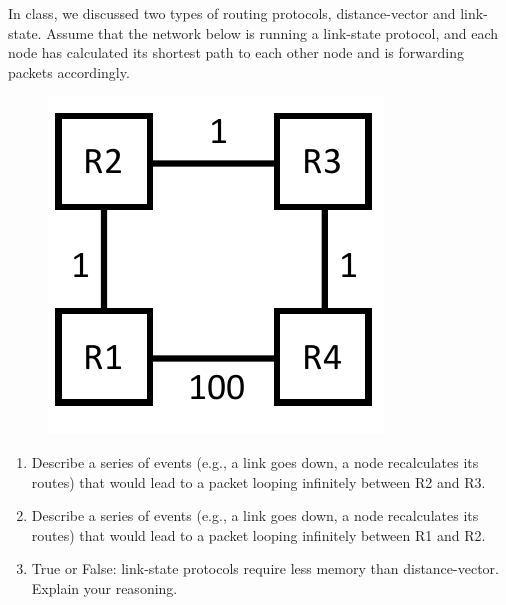 \documentclass[10pt]{article}
\newenvironment{problem}[2][]{\begin{trivlist}
\item[\hskip \labelsep {\bfseries #1}\hskip \labelsep {\bfseries #2.}]}{\end{trivlist}}
\begin{document}
\newpage
\begin{problem}{1: Link-State Infinite Loops}
\item In class, we discussed two types of routing protocols, distance-vector and link-state. Assume that the network below is running a link-state protocol, and each node has calculated its shortest path to each other node and is forwarding packets accordingly.

\begin{figure}[h]
    \centering
    \includegraphics[scale=0.6]{figures/link_state.pdf}
    \label{fig:link_state}
\end{figure}

\begin{enumerate}
    \item Describe a series of events (e.g., a link goes down, a node recalculates its routes) that would lead to a packet looping infinitely between R2 and R3.
    \item Describe a series of events (e.g., a link goes down, a node recalculates its routes) that would lead to a packet looping infinitely between R1 and R2.
    \item True or False: link-state protocols require less memory than distance-vector. Explain your reasoning. 
\end{enumerate}

\end{problem}
\end{document}
